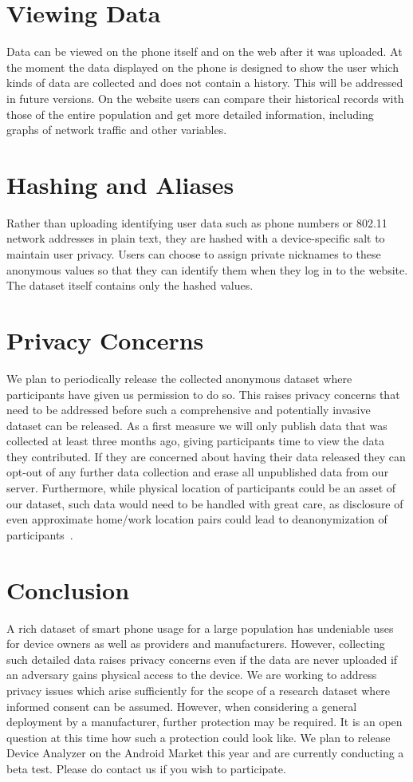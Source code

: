 \documentclass{sig-alternate}
\begin{document}
\section{Viewing Data}
Data can be viewed on the phone itself and on the web after it was uploaded.
At the moment the data displayed on the phone is designed to show the user which kinds of data are collected and does not contain a history.
This will be addressed in future versions.
On the website users can compare their historical records with those of the entire population and get more detailed information, including graphs of network traffic and other variables.

\section{Hashing and Aliases}
Rather than uploading identifying user data such as phone numbers or 802.11 network addresses in plain text, they are hashed with a device-specific salt to maintain user privacy.
Users can choose to assign private nicknames to these anonymous values so that they can identify them when they log in to the website.
The dataset itself contains only the hashed values.

\section{Privacy Concerns}
We plan to periodically release the collected anonymous dataset where participants have given us permission to do so.
This raises privacy concerns that need to be addressed before such a comprehensive and potentially invasive dataset can be released.
As a first measure we will only publish data that was collected at least three months ago, giving participants time to view the data they contributed.
If they are concerned about having their data released they can opt-out of any further data collection and erase all unpublished data from our server.
Furthermore, while physical location of participants could be an asset of our dataset, such data would need to be handled with great care, as disclosure of even approximate home/work location pairs could lead to deanonymization of participants~\cite{Golle2009}.

\section{Conclusion}
A rich dataset of smart phone usage for a large population has undeniable uses for device owners as well as providers and manufacturers.
However, collecting such detailed data raises privacy concerns even if the data are never uploaded if an adversary gains physical access to the device.
We are working to address privacy issues which arise sufficiently for the scope of a research dataset where informed consent can be assumed.
However, when considering a general deployment by a manufacturer, further protection may be required.
It is an open question at this time how such a protection could look like.
We plan to release Device Analyzer on the Android Market this year and are currently conducting a beta test.
Please do contact us if you wish to participate.
\end{document}
